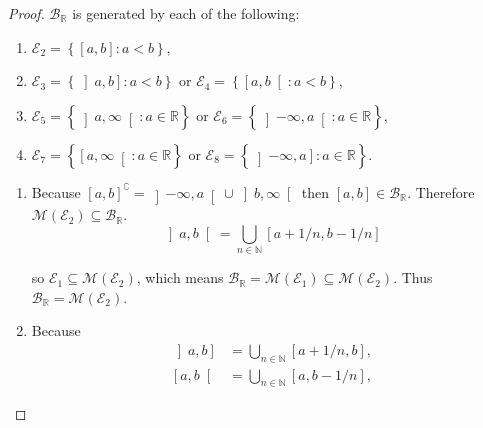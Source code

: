 \begin{proof}
    \( \mathcal{B}_{\mathbb{R}} \) is generated by each of the following:
    \begin{enumerate}[itemsep=0pt]
        \item[(b)] \( \mathcal{E}_{2} = \left\{ \left\lbrack a, b \right\rbrack : a < b \right\} \),
        \item[(c)] \( \mathcal{E}_{3} = \left\{ \left\rbrack a, b\right\rbrack : a < b \right\} \) or \( \mathcal{E}_{4} = \left\{ \left\lbrack a, b\right\lbrack : a < b \right\} \),
        \item[(d)] \( \mathcal{E}_{5} = \left\{ \left\rbrack a, \infty \right\lbrack: a \in \mathbb{R} \right\} \) or \( \mathcal{E}_{6} = \left\{ \left\rbrack -\infty, a \right\lbrack : a \in \mathbb{R} \right\} \),
        \item[(e)] \( \mathcal{E}_{7} = \left\{ \left\lbrack a, \infty \right\lbrack: a \in \mathbb{R} \right\} \) or \( \mathcal{E}_{8} = \left\{ \left\rbrack -\infty, a \right\rbrack : a \in \mathbb{R} \right\} \).
    \end{enumerate}

    \begin{enumerate}[itemsep=0pt]
        \item[(b)] Because \( {\left\lbrack a, b \right\rbrack}^{\complement} = \left\rbrack -\infty, a \right\lbrack \cup \left\rbrack b, \infty \right\lbrack \) then \( \left\lbrack a, b \right\rbrack \in \mathcal{B}_{\mathbb{R}} \). Therefore \( \mathcal{M}(\mathcal{E}_{2}) \subseteq \mathcal{B}_{\mathbb{R}} \).
              \[
                  \left\rbrack a, b \right\lbrack = \bigcup_{n \in \mathbb{N}} \left\lbrack a + 1/n, b - 1/n \right\rbrack
              \]

              so \( \mathcal{E}_{1} \subseteq \mathcal{M}(\mathcal{E}_{2}) \), which means \( \mathcal{B}_{\mathbb{R}} = \mathcal{M}(\mathcal{E}_{1}) \subseteq \mathcal{M}(\mathcal{E}_{2}) \). Thus \( \mathcal{B}_{\mathbb{R}} = \mathcal{M}(\mathcal{E}_{2}) \).
        \item[(c)] Because
              \begingroup
              \allowdisplaybreaks%
              \begin{align*}
                  \left\rbrack a, b \right\rbrack & = \bigcup_{n \in \mathbb{N}} \left\lbrack a + 1/n, b \right\rbrack, \\
                  \left\lbrack a, b \right\lbrack & = \bigcup_{n \in \mathbb{N}} \left\lbrack a, b - 1/n \right\rbrack,
              \end{align*}
              \endgroup


\end{enumerate}
\end{proof}

